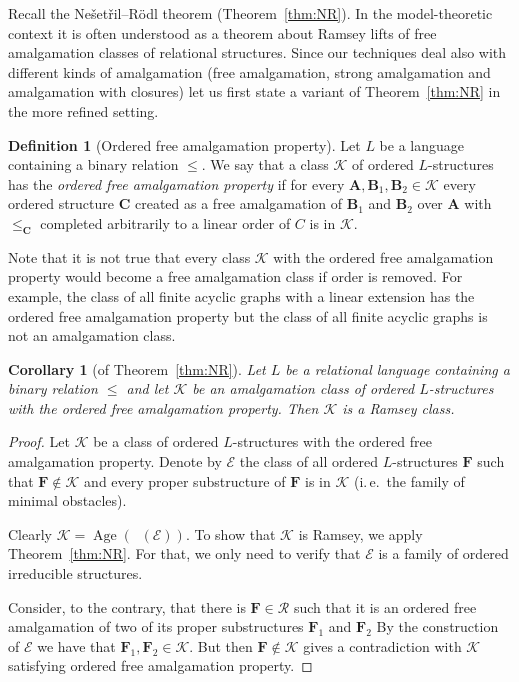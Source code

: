 \documentclass{elsarticle}
\newcommand{\ie}{i.\,e.}
\def\Forbi{\mathop{\mathrm{Forb_e}}\nolimits}
\def\Age{\mathop{\mathrm{Age}}\nolimits}
\def\str#1{\mathbf {#1}}
\def\K{{\mathcal K}}
\theoremstyle{plain}
\newtheorem{corollary}[theorem]{Corollary}
\theoremstyle{definition}
\newtheorem{definition}[theorem]{Definition}
\theoremstyle{remark}
\begin{document}
Recall the Ne\v set\v ril--R\"odl theorem (Theorem~\ref{thm:NR}).  In the
model-theoretic context it is often understood as a theorem about Ramsey lifts
of free amalgamation classes of relational structures. Since our techniques deal also with different
kinds of amalgamation (free amalgamation, strong amalgamation and amalgamation
with closures) let us first state a variant of Theorem~\ref{thm:NR}
in the more refined setting.
\begin{definition}[Ordered free amalgamation property]
  Let $L$ be a language containing a binary relation $\leq$.  We say that a class
  $\K$ of ordered $L$-structures has the \emph{ordered free amalgamation property} if for
  every $\str{A},\str{B}_1,\str{B}_2\in \K$ every ordered structure $\str{C}$ created
  as a free amalgamation of $\str{B}_1$ and $\str{B}_2$ over $\str{A}$ with
  $\leq_\str{C}$ completed arbitrarily to a linear order of $C$ is in $\K$.
\end{definition}
Note that it is not true that every class $\K$ with the ordered free amalgamation
property would become a free amalgamation class if order is removed. For example,
the class of all finite acyclic graphs with a linear extension has the ordered free
amalgamation property but the class of all finite acyclic graphs is not an
amalgamation class. 
\begin{corollary}[of Theorem~\ref{thm:NR}]
\label{cor:freeamalg}
  Let $L$ be a relational language containing a binary relation $\leq$ and let $\K$ be an
  amalgamation class of ordered $L$-structures with the ordered
  free amalgamation property. Then $\K$ is a Ramsey class.
\end{corollary}
\begin{proof}
Let $\K$ be a class of ordered $L$-structures with the ordered
free amalgamation property.  Denote by $\mathcal E$ the class of all ordered
$L$-structures $\str F$ such that $\str F\notin \K$ and every proper
substructure of $\str F$ is in $\K$ (\ie{}\ the family of minimal obstacles).

Clearly $\K=\Age(\Forbi(\mathcal E))$.
To show that $\K$ is Ramsey, we apply Theorem~\ref{thm:NR}. For that, we only
need to verify that $\mathcal E$ is a family of ordered irreducible structures.

Consider, to the contrary, that there is $\str{F}\in \mathcal R$ such that it is an
ordered free amalgamation of two of its proper substructures $\str{F}_1$ and $\str{F}_2$
By the construction of $\mathcal E$ we have that $\str{F}_1,\str{F}_2\in \K$. But then $\str{F}\notin \K$ gives
a contradiction with $\K$ satisfying ordered free amalgamation property.
\end{proof}
\end{document}
